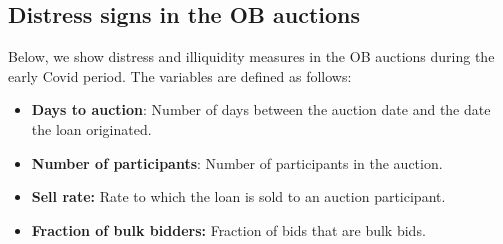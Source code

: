 \documentclass[11pt,a4paper]{article}
\begin{document}
\pagebreak

\subsection{Distress signs in the OB auctions}

Below, we show distress and illiquidity measures in the OB auctions during the early Covid period. The variables are defined as follows:
\begin{itemize}
\item \textbf{Days to auction}: Number of days between the auction date and the date the loan originated.
\item \textbf{Number of participants}: Number of participants in the auction.
\item  \textbf{Sell rate:} Rate to which the loan is sold to an auction participant. 
\item \textbf{Fraction of bulk bidders:} Fraction of bids that are bulk bids.
\end{itemize}
\end{document}
